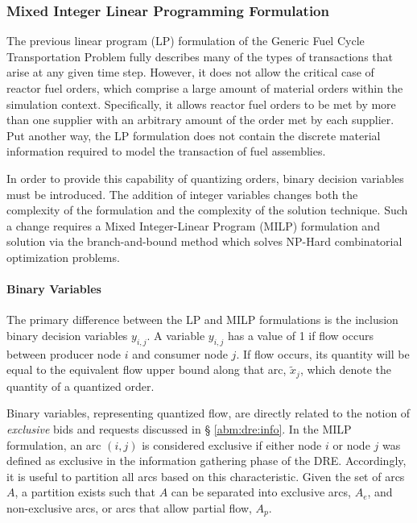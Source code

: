 \subsubsection{Mixed Integer Linear Programming Formulation}\label{abm:dre:milp}

The previous linear program (LP) formulation of the Generic Fuel Cycle
Transportation Problem fully describes many of the types of transactions that
arise at any given time step. However, it does not allow the critical case of
reactor fuel orders, which comprise a large amount of material orders within the
simulation context. Specifically, it allows reactor fuel orders to be met by
more than one supplier with an arbitrary amount of the order met by each
supplier. Put another way, the LP formulation does not contain the discrete
material information required to model the transaction of fuel assemblies. 

In order to provide this capability of quantizing orders, binary decision
variables must be introduced. The addition of integer variables changes both the
complexity of the formulation and the complexity of the solution technique. Such
a change requires a Mixed Integer-Linear Program (MILP) formulation and solution
via the branch-and-bound method which solves NP-Hard combinatorial optimization
problems.

\paragraph{Binary Variables}

The primary difference between the LP and MILP formulations is the inclusion
binary decision variables $y_{i,j}$. A variable $y_{i,j}$ has a value of 1 if
flow occurs between producer node $i$ and consumer node $j$. If flow occurs, its
quantity will be equal to the equivalent flow upper bound along that arc,
$\tilde{x}_{j}$, which denote the quantity of a quantized order.

Binary variables, representing quantized flow, are directly related to the
notion of \textit{exclusive} bids and requests discussed in \S
\ref{abm:dre:info}. In the MILP formulation, an arc $(i, j)$ is considered
exclusive if either node $i$ or node $j$ was defined as exclusive in the
information gathering phase of the DRE. Accordingly, it is useful to partition
all arcs based on this characteristic. Given the set of arcs $A$, a partition
exists such that $A$ can be separated into exclusive arcs, $A_e$, and
non-exclusive arcs, or arcs that allow partial flow, $A_p$.


